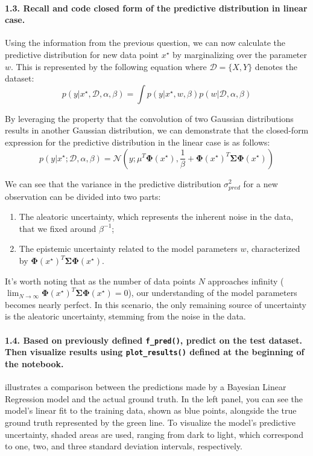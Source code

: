 \paragraph*{1.3. Recall and code closed form of the predictive distribution in linear case.}
Using the information from the previous question, we can now calculate the predictive distribution for new data point $x^\star$ by marginalizing over the parameter $w$. This is represented by the following equation where $\mathcal{D} = \{X,Y\}$ denotes the dataset:
\[ p(y|x^\star , \mathcal{D}, \alpha, \beta ) = \int p(y| x^\star, w, \beta)p(w| \mathcal{D}, \alpha, \beta ) \]

By leveraging the property that the convolution of two Gaussian distributions results in another Gaussian distribution, we can demonstrate that the closed-form expression for the predictive distribution in the linear case is as follows:
\[ p\left(y|x^\star; \mathcal{D}, \alpha, \beta\right) = \mathcal{N}\left(y; \mu^T \boldsymbol{\Phi}(x^\star), \frac{1}{\beta} + \boldsymbol{\Phi}(x^\star)^T \boldsymbol{\Sigma} \boldsymbol{\Phi}(x^\star)\right) \]

We can see that the variance in the predictive distribution $ \sigma ^2_{pred} $  for a new observation can be divided into two parts:
\begin{enumerate}
    \item The aleatoric uncertainty, which represents the inherent noise in the data, that we fixed around $ \beta ^{-1}$;
    \item The epistemic uncertainty related to the model parameters $ w $, characterized by $\boldsymbol{\Phi}(x^\star)^T \boldsymbol{\Sigma} \boldsymbol{\Phi}(x^\star).$
\end{enumerate}
It's worth noting that as the number of data points $N$ approaches infinity ($ \lim_{N \to \infty} \boldsymbol{\Phi}(x^\star)^T \boldsymbol{\Sigma} \boldsymbol{\Phi}(x^\star) = 0 $), our understanding of the model parameters becomes nearly perfect. In this scenario, the only remaining source of uncertainty is the aleatoric uncertainty, stemming from the noise in the data.

\paragraph*{1.4. Based on previously defined \texttt{f\_pred()}, predict on the test dataset. Then visualize results using \texttt{plot\_results()} defined at the beginning of the notebook.}
 illustrates a comparison between the predictions made by a Bayesian Linear Regression model and the actual ground truth. In the left panel, you can see the model's linear fit to the training data, shown as blue points, alongside the true ground truth represented by the green line. To visualize the model's predictive uncertainty, shaded areas are used, ranging from dark to light, which correspond to one, two, and three standard deviation intervals, respectively.

